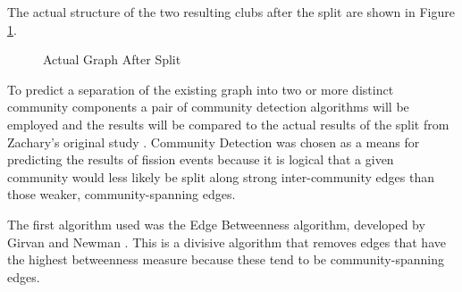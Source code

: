 \clearpage

The actual structure of the two resulting clubs after the split are shown in Figure \ref{fig:actual}.

\begin{figure}[h!]
\centering
{}
\caption{Actual Graph After Split}
\label{fig:actual}
\end{figure}

To predict a separation of the existing graph into two or more distinct community components a pair of community detection algorithms will be employed and the results will be compared to the actual results of the split from Zachary's original study \cite{wzach77}. Community Detection was chosen as a means for predicting the results of fission events because it is logical that a given community would less likely be split along strong inter-community edges than those weaker, community-spanning edges.

\clearpage

The first algorithm used was the Edge Betweenness algorithm, developed by Girvan and Newman \cite{girnew04}. This is a divisive algorithm that removes edges that have the highest betweenness measure because these tend to be community-spanning edges. 

